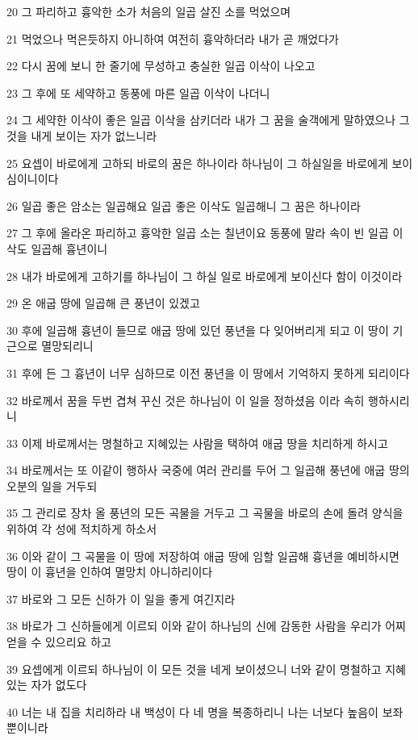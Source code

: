 \par 20 그 파리하고 흉악한 소가 처음의 일곱 살진 소를 먹었으며
\par 21 먹었으나 먹은듯하지 아니하여 여전히 흉악하더라 내가 곧 깨었다가
\par 22 다시 꿈에 보니 한 줄기에 무성하고 충실한 일곱 이삭이 나오고
\par 23 그 후에 또 세약하고 동풍에 마른 일곱 이삭이 나더니
\par 24 그 세약한 이삭이 좋은 일곱 이삭을 삼키더라 내가 그 꿈을 술객에게 말하였으나 그것을 내게 보이는 자가 없느니라
\par 25 요셉이 바로에게 고하되 바로의 꿈은 하나이라 하나님이 그 하실일을 바로에게 보이심이니이다
\par 26 일곱 좋은 암소는 일곱해요 일곱 좋은 이삭도 일곱해니 그 꿈은 하나이라
\par 27 그 후에 올라온 파리하고 흉악한 일곱 소는 칠년이요 동풍에 말라 속이 빈 일곱 이삭도 일곱해 흉년이니
\par 28 내가 바로에게 고하기를 하나님이 그 하실 일로 바로에게 보이신다 함이 이것이라
\par 29 온 애굽 땅에 일곱해 큰 풍년이 있겠고
\par 30 후에 일곱해 흉년이 들므로 애굽 땅에 있던 풍년을 다 잊어버리게 되고 이 땅이 기근으로 멸망되리니
\par 31 후에 든 그 흉년이 너무 심하므로 이전 풍년을 이 땅에서 기억하지 못하게 되리이다
\par 32 바로께서 꿈을 두번 겹쳐 꾸신 것은 하나님이 이 일을 정하셨음 이라 속히 행하시리니
\par 33 이제 바로께서는 명철하고 지혜있는 사람을 택하여 애굽 땅을 치리하게 하시고
\par 34 바로께서는 또 이같이 행하사 국중에 여러 관리를 두어 그 일곱해 풍년에 애굽 땅의 오분의 일을 거두되
\par 35 그 관리로 장차 올 풍년의 모든 곡물을 거두고 그 곡물을 바로의 손에 돌려 양식을 위하여 각 성에 적치하게 하소서
\par 36 이와 같이 그 곡물을 이 땅에 저장하여 애굽 땅에 임할 일곱해 흉년을 예비하시면 땅이 이 흉년을 인하여 멸망치 아니하리이다
\par 37 바로와 그 모든 신하가 이 일을 좋게 여긴지라
\par 38 바로가 그 신하들에게 이르되 이와 같이 하나님의 신에 감동한 사람을 우리가 어찌 얻을 수 있으리요 하고
\par 39 요셉에게 이르되 하나님이 이 모든 것을 네게 보이셨으니 너와 같이 명철하고 지혜있는 자가 없도다
\par 40 너는 내 집을 치리하라 내 백성이 다 네 명을 복종하리니 나는 너보다 높음이 보좌 뿐이니라
